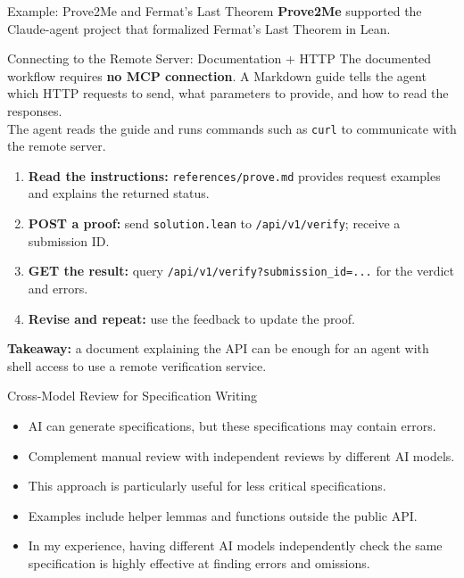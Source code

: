 \documentclass[aspectratio=169,xcolor=dvipsnames]{beamer}
\begin{document}
\begin{frame}{Example: Prove2Me and Fermat's Last Theorem}
    \small
    \textbf{Prove2Me} supported the Claude-agent project that formalized
    Fermat's Last Theorem in Lean.
    \begin{block}{Connecting to the Remote Server: Documentation + HTTP}
        The documented workflow requires \textbf{no MCP connection}.
        A Markdown guide tells the agent which HTTP requests to send,
        what parameters to provide, and how to read the responses.\\[4pt]
        The agent reads the guide and runs commands such as \texttt{curl}
        to communicate with the remote server.
    \end{block}
    \begin{enumerate}
        \item \textbf{Read the instructions:} \texttt{references/prove.md} provides
              request examples and explains the returned status.
        \item \textbf{POST a proof:} send \texttt{solution.lean} to
              \texttt{/api/v1/verify}; receive a submission ID.
        \item \textbf{GET the result:} query
              \texttt{/api/v1/verify?submission\_id=...} for the verdict and errors.
        \item \textbf{Revise and repeat:} use the feedback to update the proof.
    \end{enumerate}
    \medskip
    \textbf{Takeaway:} a document explaining the API can be enough for an agent
    with shell access to use a remote verification service.
\end{frame}

\begin{frame}{Cross-Model Review for Specification Writing}
\begin{itemize}
\item AI can generate specifications, but these specifications may contain errors.

\item Complement manual review with independent reviews by different AI models.
\item This approach is particularly useful for less critical specifications.
\item Examples include helper lemmas and functions outside the public API.
\item In my experience, having different AI models independently check the same
      specification is highly effective at finding errors and omissions.
\end{itemize}

\end{frame}
\end{document}

